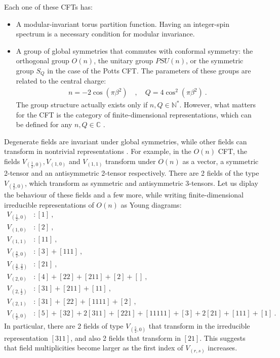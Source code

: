 \documentclass[12pt, a4paper]{article}
\begin{document}
Each one of these CFTs has:
\begin{itemize}
 \item A modular-invariant torus partition function. Having an integer-spin spectrum is a necessary condition for modular invariance.
 \item A group of global symmetries that commutes with conformal symmetry: the orthogonal group $O(n)$, the unitary group $PSU(n)$, or the symmetric group $S_Q$ in the case of the Potts CFT. The parameters of these groups are related to the central charge:
 \begin{align}
  \boxed{n = -2\cos\left(\pi \beta^2\right)} \quad , \quad \boxed{Q = 4\cos^2\left(\pi \beta^2\right)}\ .
  \label{nQ}
 \end{align}
 The group structure actually exists only if $n,Q\in\mathbb{N}^*$. However, what matters for the CFT is the category of finite-dimensional representations, which can be defined for any $n,Q\in\mathbb{C}$ \cite{gnjrs21, br19}.
\end{itemize}
Degenerate fields are invariant under global symmetries, while other fields can transform in nontrivial representations \cite{jrs22, rjrs24}.
For example, in the $O(n)$ CFT, the fields $V_{(\frac12,0)},V_{(1,0)}$ and $V_{(1,1)}$ transform under $O(n)$ as a vector, a symmetric 2-tensor and an antisymmetric 2-tensor respectively. There are 2 fields of the type $V_{(\frac32,0)}$, which transform as symmetric and antisymmetric 3-tensors. Let us diplay the behaviour of these fields and a few more, while writing finite-dimensional irreducible representations of $O(n)$ as Young diagrams:
\begin{subequations}
\label{von}
\begin{align}
 V_{(\frac12,0)} &: [1]\ , \label{lhz}
 \\
 V_{(1,0)} &: [2]\ ,
 \\
 V_{(1,1)} &: [11]\ , \label{loo}
 \\
 V_{(\frac32,0)}&: [3]+[111]\ ,
\label{l320}
\\
V_{(\frac32,\frac23)} &: [21]\ ,
\label{l3223}
\\
V_{(2,0)}&: [4]+[22]+[211]+[2]+[]\ ,
\label{l20}
\\
V_{(2,\frac12)}& : [31]+[211]+[11]\ ,
\\
V_{(2,1)} &: [31]+[22]+[1111]+[2]\ ,
\label{l21}
\\
V_{(\frac52,0)} &: [5]+[32]+2[311]+[221]+[11111]+[3]+2[21]+[111]+[1]\ .
\label{l52}
\end{align}
\end{subequations}
In particular, there are 2 fields of type $V_{(\frac52,0)}$ that transform in the irreducible representation $[311]$, and also 2 fields that transform in $[21]$. This suggests that field multiplicities become larger as the first index of $V_{(r,s)}$ increases.
\end{document}
